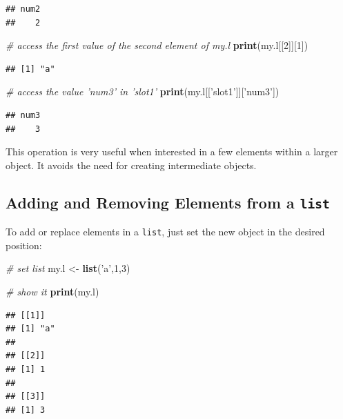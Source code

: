 \documentclass[11pt,]{book}
\newenvironment{Shaded}{\begin{snugshade}}{\end{snugshade}}
\newcommand{\KeywordTok}[1]{\textcolor[rgb]{0.27,0.27,0.27}{\textbf{#1}}}
\newcommand{\DecValTok}[1]{\textcolor[rgb]{0.06,0.06,0.06}{#1}}
\newcommand{\StringTok}[1]{\textcolor[rgb]{0.5,0.5,0.5}{#1}}
\newcommand{\CommentTok}[1]{\textcolor[rgb]{0.56,0.35,0.01}{\textit{#1}}}
\newcommand{\NormalTok}[1]{#1}
\begin{document}
\begin{verbatim}
## num2 
##    2
\end{verbatim}

\begin{Shaded}
\begin{Highlighting}[]
\CommentTok{# access the first value of the second element of my.l}
\KeywordTok{print}\NormalTok{(my.l[[}\DecValTok{2}\NormalTok{]][}\DecValTok{1}\NormalTok{])}
\end{Highlighting}
\end{Shaded}

\begin{verbatim}
## [1] "a"
\end{verbatim}

\begin{Shaded}
\begin{Highlighting}[]
\CommentTok{# access the value 'num3' in 'slot1'}
\KeywordTok{print}\NormalTok{(my.l[[}\StringTok{'slot1'}\NormalTok{]][}\StringTok{'num3'}\NormalTok{])}
\end{Highlighting}
\end{Shaded}

\begin{verbatim}
## num3 
##    3
\end{verbatim}

This operation is very useful when interested in a few elements within a
larger object. It avoids the need for creating intermediate objects.

\subsection{\texorpdfstring{Adding and Removing Elements from a
\texttt{list}}{Adding and Removing Elements from a list}}\label{adding-and-removing-elements-from-a-list}

To add or replace elements in a \texttt{list}, just set the new object
in the desired position:

\begin{Shaded}
\begin{Highlighting}[]
\CommentTok{# set list}
\NormalTok{my.l <-}\StringTok{ }\KeywordTok{list}\NormalTok{(}\StringTok{'a'}\NormalTok{,}\DecValTok{1}\NormalTok{,}\DecValTok{3}\NormalTok{)}

\CommentTok{# show it}
\KeywordTok{print}\NormalTok{(my.l)}
\end{Highlighting}
\end{Shaded}

\begin{verbatim}
## [[1]]
## [1] "a"
## 
## [[2]]
## [1] 1
## 
## [[3]]
## [1] 3
\end{verbatim}
\end{document}
